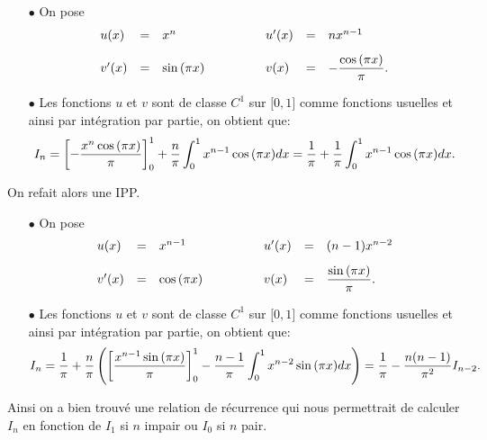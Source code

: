 \documentclass[a4paper, 11pt,reqno]{article}
\begin{document}
\begin{correction}
\begin{enumerate}
\begin{itemize}
			      \item[$\bullet$] On pose
			            $$\begin{array}{lllllll}
					            u(x)          & = & x^n           & \hspace{1cm} & u^{\prime}(x) & = & nx^{n-1}\vsec                   \\
					            v^{\prime}(x) & = & \sin{(\pi x)} & \hspace{1cm} & v(x)          & = & -\ddp\frac{\cos{(\pi x)}}{\pi}.
				            \end{array}$$
			      \item[$\bullet$] Les fonctions $u$ et $v$ sont de classe $C^1$ sur $\lbrack 0,1\rbrack$ comme fonctions usuelles et ainsi par int\'egration par partie, on obtient que:
			            $$I_n=\left\lbrack -\displaystyle\frac{x^n\cos{(\pi x)}}{\pi} \right\rbrack_0^1+\displaystyle\frac{n}{\pi}\int_0^1 x^{n-1}\cos{(\pi x)} dx=\displaystyle\frac{1}{\pi}+\displaystyle\frac{1}{\pi}\int_0^1 x^{n-1}\cos{(\pi x)} dx.$$
		      \end{itemize}
		      On refait alors une IPP.
		      \begin{itemize}
			      \item[$\bullet$] On pose
			            $$\begin{array}{lllllll}
					            u(x)          & = & x^{n-1}       & \hspace{1cm} & u^{\prime}(x) & = & (n-1)x^{n-2}\vsec              \\
					            v^{\prime}(x) & = & \cos{(\pi x)} & \hspace{1cm} & v(x)          & = & \ddp\frac{\sin{(\pi x)}}{\pi}.
				            \end{array}$$
			      \item[$\bullet$] Les fonctions $u$ et $v$ sont de classe $C^1$ sur $\lbrack 0,1\rbrack$ comme fonctions usuelles et ainsi par int\'egration par partie, on obtient que:
			            $$I_n=\displaystyle\frac{1}{\pi}+\displaystyle\frac{n}{\pi}\left( \left\lbrack \displaystyle\frac{x^{n-1}\sin{(\pi x)}}{\pi} \right\rbrack_0^1-\displaystyle\frac{n-1}{\pi}\int_0^1 x^{n-2}\sin{(\pi x)} dx\right)=\displaystyle\frac{1}{\pi}-\displaystyle\frac{n(n-1)}{\pi^2} I_{n-2}.$$
		      \end{itemize}
		      Ainsi on a bien trouv\'e une relation de r\'ecurrence qui nous permettrait de calculer $I_n$ en fonction de $I_1$ si $n$ impair ou $I_0$ si $n$ pair.
	\end{enumerate}
\end{correction}
\end{document}
